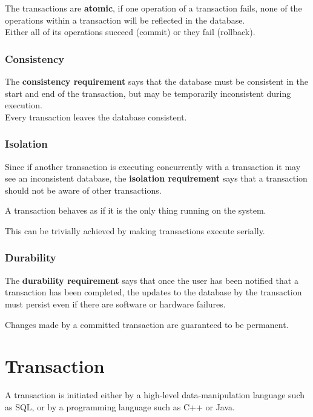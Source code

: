 \documentclass[11pt,a4paper,twocolumn]{book}
\begin{document}
The transactions are \textbf{atomic}, if one operation of a transaction fails, none of the operations within a transaction will be reflected in the database.\\

Either all of its operations succeed (commit) or they fail (rollback).

\subsubsection{Consistency}

The \textbf{consistency requirement} says that the database must be consistent in the start and end of the transaction, but may be temporarily inconsistent during execution.\\

Every transaction leaves the database consistent.

\subsubsection{Isolation}
Since if another transaction is executing concurrently with a transaction it may see an inconsistent database, the \textbf{isolation requirement} says that a transaction should not be aware of other transactions.

A transaction behaves as if it is the only thing running on the system.

This can be trivially achieved by making transactions execute serially.

\subsubsection{Durability}

The \textbf{durability requirement} says that once the user has been notified that a transaction has been completed, the updates to the database by the transaction must persist even if there are software or hardware failures.

Changes made by a committed transaction are guaranteed to be permanent.

\section{Transaction}

A transaction is initiated either by a high-level data-manipulation language such as SQL, or by a programming language such as C++ or Java.\\
\end{document}
